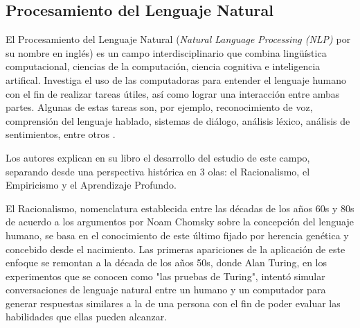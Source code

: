 \subsection{Procesamiento del Lenguaje Natural}
El Procesamiento del Lenguaje Natural (\textit{Natural Language Processing (NLP)} por su nombre en inglés) es un campo interdisciplinario que combina lingüística computacional, ciencias de la computación, ciencia cognitiva e inteligencia artifical. Investiga el uso de las computadoras para entender el lenguaje humano con el fin de realizar tareas útiles, así como lograr una interacción entre ambas partes. Algunas de estas tareas son, por ejemplo, reconocimiento de voz, comprensión del lenguaje hablado, sistemas de diálogo, análisis léxico, análisis de sentimientos, entre otros \parencite{bk_deng2018deeplearningnlp}.

Los autores \citeauthor{bk_deng2018deeplearningnlp} explican en su libro  el desarrollo del estudio de este campo, separando desde una perspectiva histórica en 3 olas: el Racionalismo, el Empiricismo y el Aprendizaje Profundo.

El Racionalismo, nomenclatura establecida entre las décadas de los años 60s y 80s de acuerdo a los argumentos por Noam Chomsky sobre la concepción del lenguaje humano, se basa en el conocimiento de este último fijado por herencia genética y concebido desde el nacimiento. Las primeras apariciones de la aplicación de este enfoque se remontan a la década de los años 50s, donde Alan Turing, en los experimentos que se conocen como "las pruebas de Turing", intentó simular conversaciones de lenguaje natural entre un humano y un computador para generar respuestas similares a la de una persona con el fin de poder evaluar las habilidades que ellas pueden alcanzar.